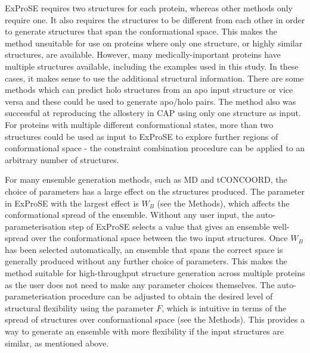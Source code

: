 ExProSE requires two structures for each protein, whereas other methods only require one.
It also requires the structures to be different from each other in order to generate structures that span the conformational space.
This makes the method unsuitable for use on proteins where only one structure, or highly similar structures, are available.
However, many medically-important proteins have multiple structures available, including the examples used in this study.
In these cases, it makes sense to use the additional structural information.
There are some methods which can predict holo structures from an apo input structure or vice versa \cite{Seeliger2010, Grove2013, Kidd2009} and these could be used to generate apo/holo pairs.
The method also was successful at reproducing the allostery in CAP using only one structure as input.
For proteins with multiple different conformational states, more than two structures could be used as input to ExProSE to explore further regions of conformational space - the constraint combination procedure can be applied to an arbitrary number of structures.

For many ensemble generation methods, such as MD and tCONCOORD, the choice of parameters has a large effect on the structures produced.
The parameter in ExProSE with the largest effect is $W_{B}$ (see the Methods), which affects the conformational spread of the ensemble.
Without any user input, the auto-parameterisation step of ExProSE selects a value that gives an ensemble well-spread over the conformational space between the two input structures.
Once $W_{B}$ has been selected automatically, an ensemble that spans the correct space is generally produced without any further choice of parameters.
This makes the method suitable for high-throughput structure generation across multiple proteins as the user does not need to make any parameter choices themselves.
The auto-parameterisation procedure can be adjusted to obtain the desired level of structural flexibility using the parameter $F$, which is intuitive in terms of the spread of structures over conformational space (see the Methods).
This provides a way to generate an ensemble with more flexibility if the input structures are similar, as mentioned above.

